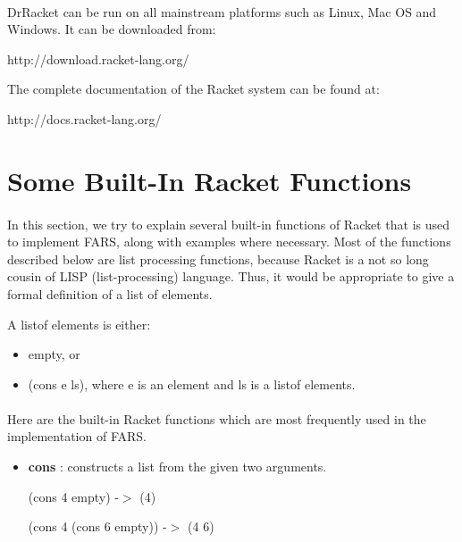 \documentclass[11pt]{report}
\begin{document}
\begin{appendices}
\paragraph{} DrRacket can be run on all mainstream platforms such as Linux, Mac OS and Windows. It can be downloaded from:

\begin{center}
 http://download.racket-lang.org/
\end{center}

The complete documentation of the Racket system can be found at:

\begin{center}
 http://docs.racket-lang.org/
\end{center}

\section{Some Built-In Racket Functions}

\paragraph{} In this section, we try to explain several built-in functions of Racket that is used to implement FARS, along with examples where necessary. Most of the functions described below are list processing functions, because Racket is a not so long cousin of LISP (list-processing) language. Thus, it would be appropriate to give a formal definition of a list of elements.

A listof elements is either:
\begin{itemize}
 \item empty, or
 \item (cons e ls), where e is an element and ls is a listof elements.
\end{itemize}

\paragraph{} Here are the built-in Racket functions which are most frequently used in the implementation of FARS.

\begin{itemize}
 \item \textbf{cons} : constructs a list from the given two arguments.

(cons 4 empty) -$>$ (4)

(cons 4 (cons 6 empty)) -$>$ (4 6)


\end{itemize}
\end{appendices}
\end{document}
